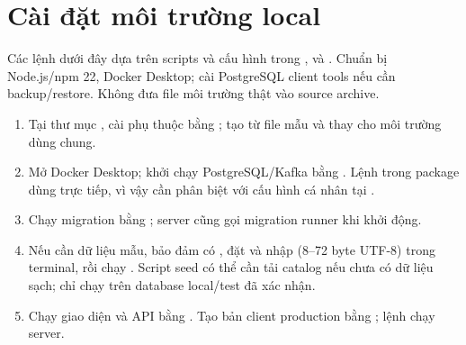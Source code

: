 \section{Cài đặt môi trường local}
Các lệnh dưới đây dựa trên scripts và cấu hình trong \texttt{}, \texttt{} và \texttt{}. Chuẩn bị Node.js/npm 22, Docker Desktop; cài PostgreSQL client tools nếu cần backup/restore. Không đưa file môi trường thật vào source archive.
\begin{enumerate}
\item Tại thư mục \texttt{}, cài phụ thuộc bằng \texttt{}; tạo \texttt{} từ file mẫu và thay \texttt{} cho môi trường dùng chung.
\item Mở Docker Desktop; khởi chạy PostgreSQL/Kafka bằng \texttt{}. Lệnh \texttt{} trong package dùng \texttt{} trực tiếp, vì vậy cần phân biệt với cấu hình cá nhân tại \texttt{}.
\item Chạy migration bằng \texttt{}; server cũng gọi migration runner khi khởi động.
\item Nếu cần dữ liệu mẫu, bảo đảm có \texttt{}, đặt \texttt{} và nhập \texttt{} (8--72 byte UTF-8) trong terminal, rồi chạy \texttt{}. Script seed có thể cần tải catalog nếu chưa có dữ liệu sạch; chỉ chạy trên database local/test đã xác nhận.
\item Chạy giao diện và API bằng \texttt{}. Tạo bản client production bằng \texttt{}; lệnh \texttt{} chạy server.
\end{enumerate}

